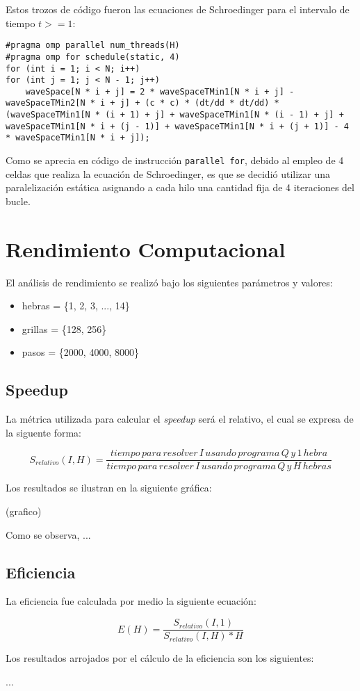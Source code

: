 \documentclass[jou]{apa6}
\begin{document}
Estos trozos de código fueron las ecuaciones de Schroedinger para el intervalo de tiempo $t >= 1$:

\lstset{language=C, breaklines=true, frame=single}

\begin{lstlisting}
#pragma omp parallel num_threads(H)
#pragma omp for schedule(static, 4)
for (int i = 1; i < N; i++)
for (int j = 1; j < N - 1; j++)
	waveSpace[N * i + j] = 2 * waveSpaceTMin1[N * i + j] - waveSpaceTMin2[N * i + j] + (c * c) * (dt/dd * dt/dd) * (waveSpaceTMin1[N * (i + 1) + j] + waveSpaceTMin1[N * (i - 1) + j] + waveSpaceTMin1[N * i + (j - 1)] + waveSpaceTMin1[N * i + (j + 1)] - 4 * waveSpaceTMin1[N * i + j]);
\end{lstlisting}

Como se aprecia en código de instrucción \texttt{parallel for}, debido al empleo de 4 celdas que realiza la ecuación de Schroedinger, es que se decidió utilizar una paralelización estática asignando a cada hilo una cantidad fija de 4 iteraciones del bucle. 

\section{Rendimiento Computacional}

El análisis de rendimiento se realizó bajo los siguientes parámetros y valores:

\begin{itemize}
	\item hebras = \{1, 2, 3, ..., 14\}
	\item grillas = \{128, 256\}
	\item pasos = \{2000, 4000, 8000\}
\end{itemize}

\subsection{Speedup}
La métrica utilizada para calcular el \textit{speedup} será el relativo, el cual se expresa de la siguente forma:

\[
	S_{relativo}(I, H) = \frac{tiempo\, para\, resolver\, I\, usando\, programa\, Q\, y\, 1\, hebra}{tiempo\, para\, resolver\, I\, usando\, programa\, Q\, y\, H\, hebras}
\]

Los resultados se ilustran en la siguiente gráfica:

(grafico)

Como se observa, ...

\subsection{Eficiencia}
La eficiencia fue calculada por medio la siguiente ecuación:

\[
	E(H) = \frac{S_{relativo}(I, 1)}{S_{relativo}(I, H) * H}
\]

Los resultados arrojados por el cálculo de la eficiencia son los siguientes:

...

\printbibliography
\end{document}
